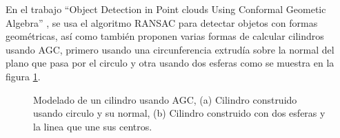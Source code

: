         En el trabajo “Object Detection in Point clouds Using Conformal Geometic Algebra” \cite{cilindrosAGC}, se usa el algoritmo RANSAC para detectar objetos con formas geométricas, así como también proponen varias formas de calcular cilindros usando AGC, primero usando una circunferencia extrudía sobre la normal del plano que pasa por el circulo y otra usando dos esferas como se muestra en la figura \ref{fig:05Antecedentes}.\\
        
        \begin{figure}[!htb] 
        	\centering
        	\caption[Modelado de un cilindro usando AGC.]{Modelado de un cilindro usando AGC, (a) Cilindro construido usando circulo y su normal, (b) Cilindro construido con dos esferas y la linea que une sus centros.} 
        	\label{fig:05Antecedentes}
        \end{figure}
        
        
    
